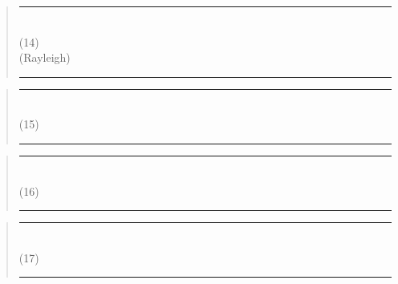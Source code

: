 \documentclass{article}
\begin{document}
\pagebreak[3] \begin{quote}\rule{\textwidth}{3pt}\\
(14)\\
(Rayleigh)



\rule{\textwidth}{3pt}
\end{quote}

\pagebreak[3] \begin{quote}\rule{\textwidth}{3pt}\\
(15)\\


\rule{\textwidth}{3pt}
\end{quote}

\pagebreak[3] \begin{quote}\rule{\textwidth}{3pt}\\
(16)\\


\rule{\textwidth}{3pt}
\end{quote}

\pagebreak[3] \begin{quote}\rule{\textwidth}{3pt}\\
(17)\\


\rule{\textwidth}{3pt}
\end{quote}




{}

\end{document}
